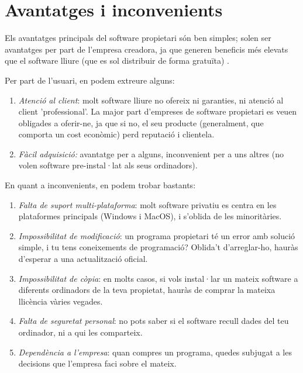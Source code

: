 \section{Avantatges i inconvenients}

Els avantatges principals del software propietari  són ben simples; solen ser avantatges per part
de l'empresa creadora, ja que generen beneficis més elevats que el software lliure (que es sol distribuir
de forma gratuïta) \cite{gentegeek}.

Per part de l'usuari, en podem extreure alguns:

\begin{enumerate}
\item \emph{Atenció al client}: molt software lliure no ofereix ni garanties, ni atenció al client 'professional'.
La major part d'empreses de software propietari es veuen obligades a oferir-ne, ja que si no, el seu producte (generalment,
que comporta un cost econòmic) perd reputació i clientela.
\item \emph{Fàcil adquisició:} avantatge per a alguns, inconvenient per a uns altres (no volen software pre-instal·lat als seus
ordinadors).
\end{enumerate}

En quant a inconvenients, en podem trobar bastants:
\begin{enumerate}
\item \emph{Falta de suport multi-plataforma}: molt software privatiu es centra en les plataformes principals (Windows i MacOS),
i s'oblida de les minoritàries.
\item \emph{Impossibilitat de modificació}: un programa propietari té un error amb solució simple, i tu tens coneixements de
programació? Oblida't d'arreglar-ho, hauràs d'esperar a una actualització oficial.
\item \emph{Impossibilitat de còpia}: en molts casos, si vols instal·lar un mateix software a diferents ordinadors de la teva
propietat, hauràs de comprar la mateixa llicència vàries vegades.
\item \emph{Falta de seguretat personal}: no pots saber si el software recull dades del teu ordinador, ni a qui les comparteix.
\item \emph{Dependència a l'empresa}: quan compres un programa, quedes subjugat a les decisions que l'empresa faci sobre el mateix.
\end{enumerate}

